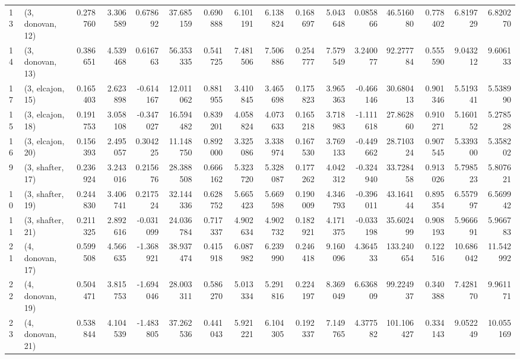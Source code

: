 \begin{tabular}{llrrrrrrrrrrrrrr}
13 &  (3, donovan, 12) &   0.278760 &  3.306589 &  0.678692 &  37.685159 &  0.690888 &   6.101191 &  6.138824 &  0.168697 &  5.043648 &  0.085866 &   46.516080 &  0.778402 &   6.819729 &   6.820270 \\
14 &  (3, donovan, 13) &   0.386651 &  4.539468 &  0.616763 &  56.353335 &  0.541725 &   7.481506 &  7.506886 &  0.254777 &  7.579549 &  3.240077 &   92.277784 &  0.555590 &   9.043212 &   9.606133 \\
17 &  (3, elcajon, 15) &   0.165403 &  2.623898 & -0.614167 &  12.011062 &  0.881955 &   3.410845 &  3.465698 &  0.175823 &  3.965363 & -0.466146 &   30.680413 &  0.901346 &   5.519341 &   5.538990 \\
15 &  (3, elcajon, 18) &   0.191753 &  3.058108 & -0.347027 &  16.594482 &  0.839201 &   4.058824 &  4.073633 &  0.165218 &  3.718983 & -1.111618 &   27.862860 &  0.910271 &   5.160152 &   5.278528 \\
16 &  (3, elcajon, 20) &   0.156393 &  2.495057 &  0.304225 &  11.148750 &  0.892000 &   3.325086 &  3.338974 &  0.167530 &  3.769133 & -0.449662 &   28.710324 &  0.907545 &   5.339300 &   5.358202 \\
9  &  (3, shafter, 17) &   0.236924 &  3.243016 &  0.215676 &  28.388508 &  0.666162 &   5.323720 &  5.328087 &  0.177262 &  4.042312 & -0.324940 &   33.728458 &  0.913026 &   5.798523 &   5.807621 \\
10 &  (3, shafter, 19) &   0.244830 &  3.406741 &  0.217524 &  32.144336 &  0.628752 &   5.665423 &  5.669598 &  0.190009 &  4.346793 & -0.396011 &   43.164144 &  0.895354 &   6.557997 &   6.569942 \\
11 &  (3, shafter, 21) &   0.211325 &  2.892616 & -0.031099 &  24.036784 &  0.717337 &   4.902634 &  4.902732 &  0.182921 &  4.171375 & -0.033198 &   35.602499 &  0.908193 &   5.966691 &   5.966783 \\
21 &  (4, donovan, 17) &   0.599508 &  4.566635 & -1.368921 &  38.937474 &  0.415918 &   6.087982 &  6.239990 &  0.246418 &  9.160096 &  4.364533 &  133.240654 &  0.122516 &  10.686042 &  11.542992 \\
22 &  (4, donovan, 19) &   0.504471 &  3.815753 & -1.694046 &  28.003311 &  0.586270 &   5.013334 &  5.291816 &  0.224197 &  8.369049 &  6.636809 &   99.224937 &  0.340388 &   7.428170 &   9.961171 \\
23 &  (4, donovan, 21) &   0.538844 &  4.104539 & -1.483805 &  37.262536 &  0.441043 &   5.921221 &  6.104305 &  0.192337 &  7.149765 &  4.377582 &  101.106427 &  0.334143 &   9.052249 &  10.055169 \\

\end{tabular}
